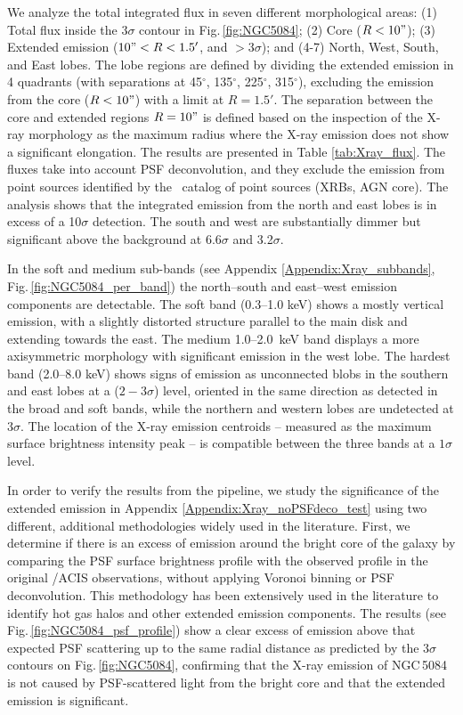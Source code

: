 \documentclass[modern]{CORE-AAS/aastex631}
\begin{document}
{We analyze the total integrated flux in seven different morphological areas: (1) Total %
flux inside the $3\sigma$ contour in Fig.\,\ref{fig:NGC5084}; (2) Core ($R<10"$); (3) Extended emission ($10"<R<1.5'$, and $>3\sigma$); and (4-7) North, West, South, and East lobes. The lobe regions are defined by dividing the extended emission in 4 quadrants (with separations at 45$^{\circ}$, 135$^{\circ}$, 225$^{\circ}$, 315$^{\circ}$), excluding the emission from the core ($R<10"$) with a limit at $R=1.5'$. The separation between the core and extended regions $R=10"$ is defined based on the inspection of the X-ray morphology as the maximum radius where the X-ray emission does not show a significant elongation. The results are presented in Table \ref{tab:Xray_flux}. The fluxes take into account PSF deconvolution, and they exclude the emission from point sources identified by the \Chandra\ catalog of point sources (XRBs, AGN core). The analysis shows that the integrated emission from the north and east lobes is in excess of a 10$\sigma$ detection. The south and west are substantially dimmer but significant above the background at 6.6$\sigma$ and 3.2$\sigma$. 

In the soft and medium sub-bands (see Appendix \ref{Appendix:Xray_subbands}, Fig.\,\ref{fig:NGC5084_per_band}) the north--south and east--west emission components are detectable. The soft band (0.3--1.0 keV) shows a mostly vertical emission, with a slightly distorted structure parallel to the main disk and extending towards the east. The medium 1.0--2.0~keV band displays a more axisymmetric morphology with significant emission in the west lobe. The hardest band (2.0--8.0 keV) shows signs of emission as unconnected blobs in the southern and east lobes at a ($2-3\sigma$) level, oriented in the same direction as detected in the broad and soft bands, while the northern and western lobes are undetected at $3\sigma$. The location of the X-ray emission centroids -- measured as the maximum surface brightness intensity peak -- is compatible between the three bands at a $1\sigma$ level.


In order to verify the results from the pipeline, we study the significance of the extended emission in Appendix \ref{Appendix:Xray_noPSFdeco_test} using two different, additional methodologies widely used in the literature. First, we determine if there is an excess of emission around the bright core of the galaxy by comparing the PSF surface brightness profile with the observed profile in the original \Chandra/ACIS observations, without applying Voronoi binning or PSF deconvolution. This methodology has been extensively used in the literature \citep{fabbiano+2017apj842_4,fabbiano+2018apj855_131, jones+2020apj891_133,ma+2020apj900_164,ma+2023apj948_61} to identify hot gas halos and other extended emission components. The results (see Fig.\,\ref{fig:NGC5084_psf_profile}) show a clear excess of emission above that expected PSF scattering up to the same radial distance as predicted by the $3\sigma$ contours on Fig.\,\ref{fig:NGC5084}, confirming that the X-ray emission of NGC\,5084 is not caused by PSF-scattered light from the bright core and that the extended emission is significant.

}
\end{document}
